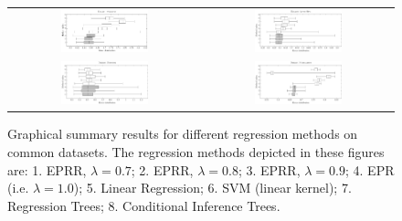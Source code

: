 \documentclass[review,preprint]{elsarticle}
\begin{document}
%
\begin{figure}[tb]\begin{center}
\begin{tabular}{cc}
\includegraphics[width=0.48\textwidth]{Fig3a.pdf}
&
\includegraphics[width=0.48\textwidth]{Fig3b.pdf}
\\
\includegraphics[width=0.48\textwidth]{Fig3c.pdf}
&
\includegraphics[width=0.48\textwidth]{Fig3d.pdf}
\end{tabular}
%
\caption{Graphical summary results for different regression methods on common datasets. 
The regression methods depicted in these figures are:
1. \ac{EPRR}, $\lambda = 0.7$;
2. \ac{EPRR}, $\lambda = 0.8$;
3. \ac{EPRR}, $\lambda = 0.9$;
4. \ac{EPR} (i.e. $\lambda = 1.0$);
5. Linear Regression;
6. \ac{SVM} (linear kernel);
7. Regression Trees;
8. Conditional Inference Trees.}
\label{fig:four.datasets.summary}
\label{Housing_dataset_lambda0.8_25runs}
\label{Abalone_dataset_lambda0.8_25runs}
\label{Auto-Mpg_dataset_lambda0.8_25runs}
\label{Kinematics300_lambda0.8_25runs}
\end{center}\end{figure}
\end{document}
